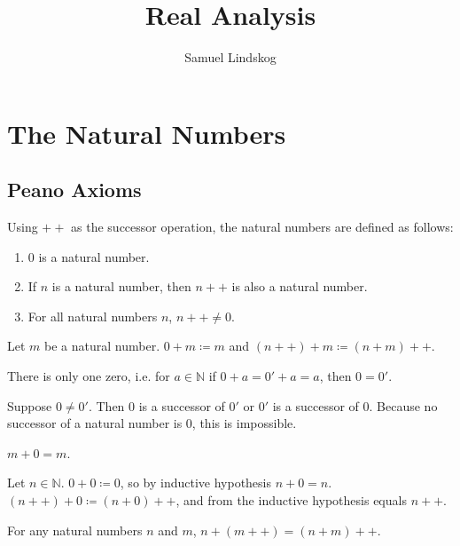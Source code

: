 \documentclass{article}
\title{Real Analysis}
\author{Samuel Lindskog}
\begin{document}
\maketitle
{}
\tableofcontents
{}
\clearpage
{}
\setcounter{page}{1}

\section{The Natural Numbers}
\subsection{Peano Axioms}
\begin{definition}
	Using \(++\) as the successor operation, the natural numbers are defined as follows:
	\begin{enumerate}
		\item \(0\) is a natural number.
		\item If \(n\) is a natural number, then \(n++\) is also a natural number.
		\item For all natural numbers \(n\), \(n++\neq 0\).
	\end{enumerate}
\end{definition}
\begin{definition}
	Let \(m\) be a natural number. \(0+m\coloneq m\) and \((n++)+m\coloneq(n+m)++\).
\end{definition}
\begin{proposition}
	\label{uniquezero}
	There is only one zero, i.e. for \(a\in\mathbb{N}\) if \(0+a=0'+a=a\), then \(0=0'\).
\end{proposition}
	\begin{IEEEproof}
		Suppose \(0\neq 0'\). Then \(0\) is a successor of \(0'\) or \(0'\) is a successor of \(0\). Because no successor of a natural number is \(0\), this is impossible.
	\end{IEEEproof}
\begin{proposition}
	\label{zerocommute}
	\(m+0=m\).
\end{proposition}
	\begin{IEEEproof}
		Let \(n\in\mathbb{N}\). \(0+0\coloneq 0\), so by inductive hypothesis \(n+0=n\). \((n++)+0\coloneq(n+0)++\), and from the inductive hypothesis equals \(n++\).
	\end{IEEEproof}
\begin{lemma}
	\label{rightaddition}
	For any natural numbers \(n\) and \(m\), \(n+(m++)=(n+m)++\).
\end{lemma}
\end{document}
